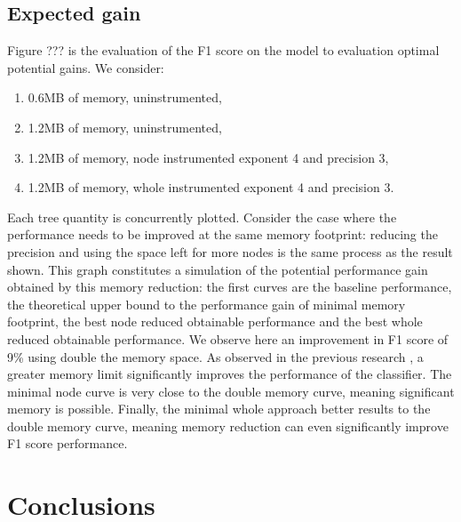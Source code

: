 \documentclass[conference]{IEEEtran}
\begin{document}
\subsection{Expected gain}
Figure ??? is the evaluation of the F1 score on the model to evaluation optimal potential gains. We consider:
\begin{enumerate}
    \item 0.6MB of memory, uninstrumented,
    \item 1.2MB of memory, uninstrumented,
    \item 1.2MB of memory, node instrumented exponent 4 and precision 3,
    \item 1.2MB of memory, whole instrumented exponent 4 and precision 3.
\end{enumerate}
Each tree quantity is concurrently plotted. Consider the case where the performance needs to be improved at the same memory footprint: reducing the precision and using the space left for more nodes is the same process as the result shown. This graph constitutes a simulation of the potential performance gain obtained by this memory reduction: the first curves are the baseline performance, the theoretical upper bound to the performance gain of minimal memory footprint, the best node reduced obtainable performance and the best whole reduced obtainable performance.
We observe here an improvement in F1 score of 9\% using double the memory space. As observed in the previous research \cite{khannouz2020benchmark}, a greater memory limit significantly improves the performance of the classifier. The minimal node curve is very close to the double memory curve, meaning significant memory is possible. Finally, the minimal whole approach better results to the double memory curve, meaning memory reduction can even significantly improve F1 score performance.
\section{Conclusions}
\end{document}
